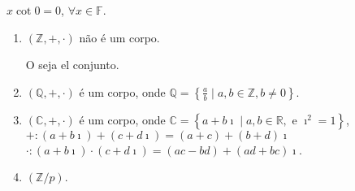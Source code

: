 \begin{proposition}
	$x\cot0=0$, $\forall x\in\mathbb{F}$.
\end{proposition}

\begin{example}
	\begin{enumerate}
		\item

		      $\left(\mathbb{Z},+,\cdot\right)$ não é um corpo.

		      O seja el conjunto.

		\item

		      $\left(\mathbb{Q},+,\cdot\right)$ é um corpo, onde
		      $\mathbb{Q}=\left\{\frac{a}{b}\mid a,b\in\mathbb{Z},b\neq0\right\}$.

		\item

		      $\left(\mathbb{C},+,\cdot\right)$ é um corpo, onde
		      $\mathbb{C}=\left\{a+b\imath\mid a,b\in\mathbb{R},\text{ e }\imath^{2}=1\right\}$,
		      $+\colon\left(a+b\imath\right)+\left(c+d\imath\right)=\left(a+c\right)+\left(b+d\right)\imath$
		      $\cdot\colon\left(a+b\imath\right)\cdot\left(c+d\imath\right)=\left(ac-bd\right)+\left(ad+bc\right)\imath$.

		\item

		      $\left(\mathbb{Z}/p\right)$.
	\end{enumerate}
\end{example}

